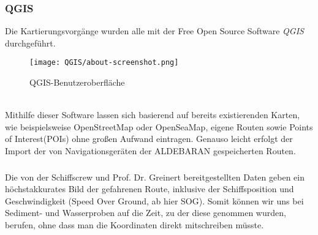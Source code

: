 \subsubsection*{QGIS}
Die Kartierungsvorgänge wurden alle mit der Free Open Source Software \emph{QGIS}\cite{qgis} durchgeführt.
\begin{figure}[ht]
    \centering
    \texttt{[image: QGIS/about-screenshot.png]}
    \caption[fig:qgisabout]{QGIS-Benutzeroberfläche}
\end{figure}
\\Mithilfe dieser Software lassen sich basierend auf bereits existierenden Karten, 
wie beispielsweise OpenStreetMap\cite{ostrm} oder OpenSeaMap\cite{oseam}, eigene Routen sowie
Points of Interest(POIs) ohne großen Aufwand eintragen. Genauso leicht erfolgt der Import der von 
Navigationsgeräten der ALDEBARAN gespeicherten Routen. 
\subsubsection*{}
Die von der Schiffscrew und Prof. Dr. Greinert bereitgestellten Daten geben ein höchstakkurates Bild der
gefahrenen Route, inklusive der Schiffsposition und Geschwindigkeit (Speed Over Ground, ab hier SOG).
Somit können wir uns bei Sediment- und Wasserproben auf die Zeit, zu der diese genommen wurden, berufen,
ohne dass man die Koordinaten direkt mitschreiben müsste.
